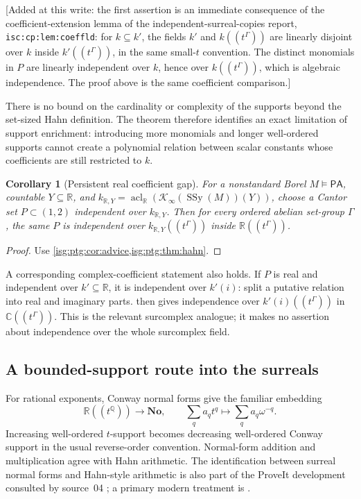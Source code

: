 \documentclass[11pt]{article}
\newtheorem{corollary}[corollary]{Corollary}
\theoremstyle{definition}
\theoremstyle{remark}
\newcommand{\No}{\ensuremath{\mathbf{No}}}
\newcommand{\R}{\mathbb{R}}
\newcommand{\C}{\mathbb{C}}
\newcommand{\Q}{\mathbb{Q}}
\newcommand{\PA}{\mathsf{PA}}
\newcommand{\SSy}{\operatorname{SSy}}
\newcommand{\acl}{\operatorname{acl}}
\newcommand{\replabel}[1]{\nolinkurl{#1}}
\begin{document}
\textup{[}Added at this write: the first assertion is an immediate
consequence of the coefficient-extension lemma of the
independent-surreal-copies report, \replabel{isc:cp:lem:coeffld}: for
$k\subseteq k'$, the fields $k'$ and $k((t^\Gamma))$ are linearly disjoint
over $k$ inside $k'((t^\Gamma))$, in the same small-$t$ convention. The
distinct monomials in $P$ are linearly independent over $k$, hence over
$k((t^\Gamma))$, which is algebraic independence. The proof above is the
same coefficient comparison.\textup{]}

There is no bound on the cardinality or complexity of the supports beyond
the set-sized Hahn definition. The theorem therefore identifies an exact
limitation of support enrichment: introducing more monomials and longer
well-ordered supports cannot create a polynomial relation between scalar
constants whose coefficients are still restricted to $k$.

\begin{corollary}[Persistent real coefficient gap]\label{isg:ptg:cor:hahnarith}
For a nonstandard Borel $M\models\PA$, countable $Y\subseteq\R$, and
$k_{\R,Y}=\acl_\R(\mathcal K_\infty(\SSy(M))(Y))$, choose a Cantor set
$P\subset(1,2)$ independent over $k_{\R,Y}$. Then for every ordered abelian
set-group $\Gamma$, the same $P$ is independent over
$k_{\R,Y}((t^\Gamma))$ inside $\R((t^\Gamma))$.
\end{corollary}
\begin{proof}
Use \cref{isg:ptg:cor:advice,isg:ptg:thm:hahn}.
\end{proof}

A corresponding complex-coefficient statement also holds. If $P$ is real
and independent over $k'\subseteq\R$, it is independent over $k'(i)$:
split a putative relation into real and imaginary parts.
 then gives independence over $k'(i)((t^\Gamma))$ in
$\C((t^\Gamma))$. This is the relevant surcomplex analogue; it makes no
assertion about independence over the whole surcomplex field.

\subsection{A bounded-support route into the surreals}\label{isg:ptg:sec:omnific}
For rational exponents, Conway normal forms give the familiar embedding
\begin{equation}\label{isg:ptg:eq:surrealmap}
 \R((t^\Q))\longrightarrow\No,
 \qquad \sum_q a_q t^q\longmapsto\sum_q a_q\omega^{-q}.
\end{equation}
Increasing well-ordered $t$-support becomes decreasing well-ordered Conway
support in the usual reverse-order convention. Normal-form addition and
multiplication agree with Hahn arithmetic. The identification between
surreal normal forms and Hahn-style arithmetic is also part of the ProveIt
development consulted by source~04 \cite{ProveItPTG}; a primary modern
treatment is \cite{BKMM}.
\end{document}
